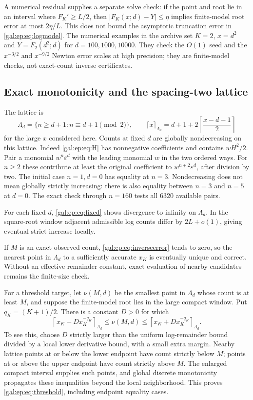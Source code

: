\documentclass[11pt,letterpaper]{article}
\numberwithin{equation}{section}
\theoremstyle{definition}\newtheorem{definition}[theorem]{Definition}
\theoremstyle{remark}\newtheorem{remark}[theorem]{Remark}
\newcommand{\eps}{\varepsilon}
\begin{document}
A numerical residual supplies a separate solve check: if the point and root lie in an interval where $F_K'\ge L/2$, then $|F_K(x;d)-Y|\le\eta$ implies finite-model root error at most $2\eta/L$. This does not bound the asymptotic truncation error in \eqref{gal:ep:eq:logmodel}. The numerical examples in the archive set $K=2$, $x=d^2$ and $Y=F_2(d^2;d)$ for $d=100,1000,10000$. They check the $O(1)$ seed and the $x^{-3/2}$ and $x^{-9/2}$ Newton error scales at high precision; they are finite-model checks, not exact-count inverse certificates.

\subsection{Exact monotonicity and the spacing-two lattice}
The lattice is
\[
\Lambda_d=\{n\ge d+1:n\equiv d+1\pmod2\},\qquad
\lceil x\rceil_{\Lambda_d}=d+1+2\left\lceil\frac{x-d-1}{2}\right\rceil
\]
for the large $x$ considered here. Counts at fixed $d$ are globally nondecreasing on this lattice. Indeed \eqref{gal:ep:eq:H} has nonnegative coefficients and contains $wH^2/2$. Pair a monomial $w^n\eps^d$ with the leading monomial $w$ in the two ordered ways. For $n\ge2$ these contribute at least the original coefficient to $w^{n+2}\eps^d$, after division by two. The initial case $n=1,d=0$ has equality at $n=3$. Nondecreasing does not mean globally strictly increasing: there is also equality between $n=3$ and $n=5$ at $d=0$. The exact check through $n=160$ tests all 6320 available pairs.

For each fixed $d$, \eqref{gal:ep:eq:fixed} shows divergence to infinity on $\Lambda_d$. In the square-root window adjacent admissible log counts differ by $2L+o(1)$, giving eventual strict increase locally.

If $M$ is an exact observed count, \eqref{gal:ep:eq:inverseerror} tends to zero, so the nearest point in $\Lambda_d$ to a sufficiently accurate $x_K$ is eventually unique and correct. Without an effective remainder constant, exact evaluation of nearby candidates remains the finite-size check.

For a threshold target, let $\nu(M,d)$ be the smallest point in $\Lambda_d$ whose count is at least $M$, and suppose the finite-model root lies in the large compact window. Put $q_K=(K+1)/2$. There is a constant $D>0$ for which
\begin{equation}\label{gal:ep:eq:threshold}
\left\lceil x_K-Dx_K^{-q_K}\right\rceil_{\Lambda_d}
\le\nu(M,d)\le
\left\lceil x_K+Dx_K^{-q_K}\right\rceil_{\Lambda_d}.
\end{equation}
To see this, choose $D$ strictly larger than the uniform log-remainder bound divided by a local lower derivative bound, with a small extra margin. Nearby lattice points at or below the lower endpoint have count strictly below $M$; points at or above the upper endpoint have count strictly above $M$. The enlarged compact interval supplies such points, and global discrete monotonicity propagates these inequalities beyond the local neighborhood. This proves \eqref{gal:ep:eq:threshold}, including endpoint equality cases.
\end{document}
